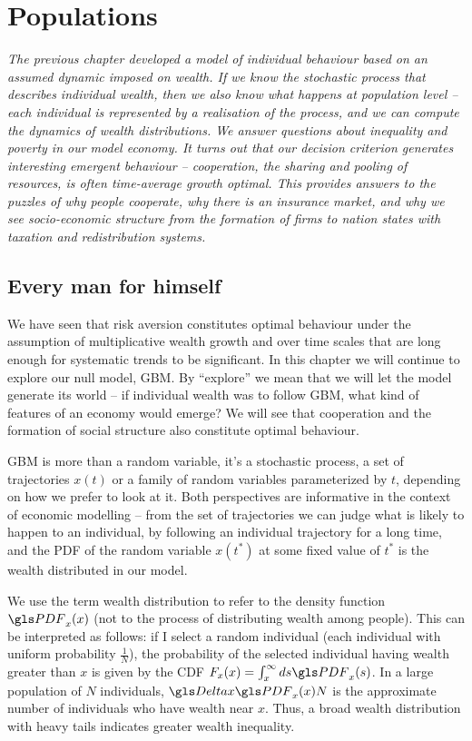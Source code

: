 \newpage

\section{Populations}
{\it 
The previous chapter developed a model of individual behaviour based on an
assumed dynamic imposed on wealth. If we know the stochastic process that describes
individual wealth, then we also know what happens at population level -- each individual
is represented by a realisation of the process, and we can compute 
the dynamics of wealth distributions. We answer questions about inequality and poverty in
our model economy. It turns out that our decision criterion generates interesting emergent
behaviour -- cooperation, the sharing and pooling of resources, is often time-average 
growth optimal. This provides answers to the puzzles of why people cooperate, why there 
is an insurance market, and why we see socio-economic structure from the formation of 
firms to nation states with taxation and redistribution systems.}
\newpage

\subsection{Every man for himself}

We have seen that risk aversion constitutes optimal behaviour under the assumption 
of multiplicative wealth growth and over time scales that are long enough for systematic 
trends to be significant. In this chapter we will continue to explore our null model, 
GBM. By ``explore'' we mean that we will let the model generate its world -- if 
individual wealth was to follow GBM, what kind of features of an economy would emerge? 
We will see that cooperation and the formation of social structure also constitute 
optimal behaviour.

GBM is more than a random variable, it's a stochastic process, \ie a set of trajectories 
$x(t)$ or  a family of random variables parameterized by $t$, depending on how we 
prefer to look at it.  Both perspectives are informative in the context of economic modelling
-- from the set of trajectories we can judge what is likely to happen to an individual, 
\eg by following an individual trajectory for a long time, and the PDF of the random 
variable $x(t^*)$ at some fixed value of $t^*$ is the wealth distributed in our model. 

We use the term wealth distribution to refer to the density function 
$\PDF_x(x)$ (not to the process of distributing wealth among people). This can be 
interpreted as follows: if I select a random individual (each individual with uniform probability 
$\frac{1}{N}$), the probability of the selected individual 
having wealth greater than $x$ is given by the CDF $F_x(x)=\int_x^\infty ds \PDF_x(s)$.
In a large population of $N$ individuals, $\D x \PDF_x(x)N$ is the approximate 
number of individuals who have wealth near $x$. 
Thus, a broad wealth distribution with heavy tails indicates greater wealth inequality. 

